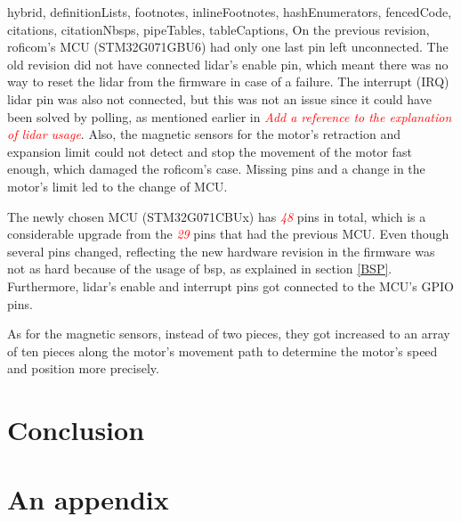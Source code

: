 \documentclass[
  digital,     %
  oneside,     %
  nosansbold,  %
  nocolorbold, %
  nolof,         %
  nolot,         %
]{fithesis4}
\newcommand{\TODO}[1]{\textcolor{red}{\textit{#1}}}
\begin{document}
\begin{markdown*}{%
  hybrid,
  definitionLists,
  footnotes,
  inlineFootnotes,
  hashEnumerators,
  fencedCode,
  citations,
  citationNbsps,
  pipeTables,
  tableCaptions,
}
On the previous revision, \acrshort{roficom}'s MCU (STM32G071GBU6) had only one last pin left unconnected. The old revision did not have connected \acrshort{lidar}'s enable pin, which meant there was no way to reset the \acrshort{lidar} from the firmware in case of a failure. The interrupt (IRQ) \acrshort{lidar} pin was also not connected, but this was not an issue since it could have been solved by polling, as mentioned earlier in \TODO{Add a reference to the explanation of lidar usage}. Also, the magnetic sensors for the motor's retraction and expansion limit could not detect and stop the movement of the motor fast enough, which damaged the \acrshort{roficom}'s case. Missing pins and a change in the motor's limit led to the change of MCU.

The newly chosen MCU (STM32G071CBUx) has \TODO{48} pins in total, which is a considerable upgrade from the \TODO{29} pins that had the previous MCU. Even though several pins changed, reflecting the new hardware revision in the firmware was not as hard because of the usage of \acrshort{bsp}, as explained in section \ref{BSP}. Furthermore, \acrshort{lidar}'s enable and interrupt pins got connected to the MCU's GPIO pins.

As for the magnetic sensors, instead of two pieces, they got increased to an array of ten pieces along the motor's movement path to determine the motor's speed and position more precisely.

\end{markdown*}

\chapter{Conclusion}


\appendix %
\chapter{An appendix}
\end{document}
